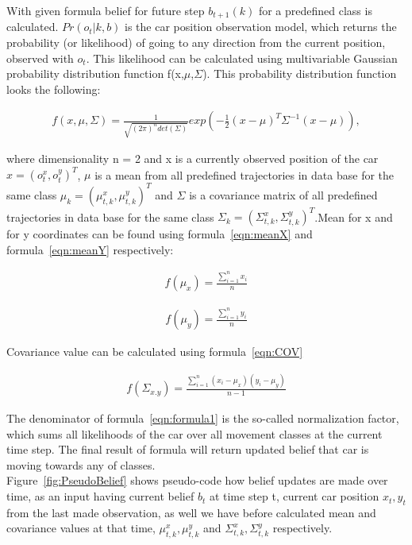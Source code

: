 With given formula belief for future step $b_{t+1}(k)$ for a predefined class is calculated. $Pr(o_{t} | k, b)$ is the car position observation model, which returns the probability (or likelihood) of going to any direction from the current position, observed with $o_{t}$. This likelihood can be calculated using multivariable Gaussian probability distribution function f(x,$\mu$,$\Sigma$). This probability distribution function looks the following:

\begin{equation}
\begin{split}
f(x,\mu,\Sigma) = \displaystyle \frac{1}{\sqrt{(2 \pi)^n det(\Sigma)}} exp(-\frac{1}{2}(x-\mu)^T\Sigma^{-1}(x-\mu)), 
\end{split}
\label{eqn:formula2}
\end{equation}

where dimensionality n = 2 and x is a currently observed position of the car $x = (o_t^x, o_t^y)^T$, $\mu$ is a mean from all predefined trajectories in data base for the same class $\mu_k  = (\mu_{t,k}^x, \mu_{t,k}^y)^T$ and $\Sigma$ is a covariance matrix of all predefined trajectories in data base for the same class $\Sigma_k  = (\Sigma_{t,k}^x, \Sigma_{t,k}^y)^T$.Mean for x and for y coordinates can be found using formula~\ref{eqn:meanX} and formula~\ref{eqn:meanY} respectively:

\begin{equation}
\begin{split}
f(\mu_x) = \displaystyle \frac{\sum_{i=1}^{n} x_i}{n}
\end{split}
\label{eqn:meanX}
\end{equation}

\begin{equation}
\begin{split}
f(\mu_y) = \displaystyle \frac{\sum_{i=1}^{n} y_i}{n}
\end{split}
\label{eqn:meanY}
\end{equation}

Covariance value can be calculated using formula~\ref{eqn:COV}

\begin{equation}
\begin{split}
f(\Sigma_{x.y}) = \displaystyle \frac{\sum_{i=1}^{n} (x_i - \mu_x)(y_i - \mu_y)}{n-1}
\end{split}
\label{eqn:COV}
\end{equation}

The denominator of formula~\ref{eqn:formula1} is the so-called normalization factor, which sums all likelihoods of the car over all movement classes at the current time step. The final result of formula will return updated belief that car is moving towards any of classes. \\
Figure~\ref{fig:PseudoBelief} shows pseudo-code how belief updates are made over time, as an input having current belief $b_t$ at time step t, current car position $x_t, y_t$ from the last made observation, as well we have before calculated mean and covariance values at that time, $\mu_{t,k}^x, \mu_{t,k}^y$ and $\Sigma_{t,k}^x, \Sigma_{t,k}^y$ respectively.

